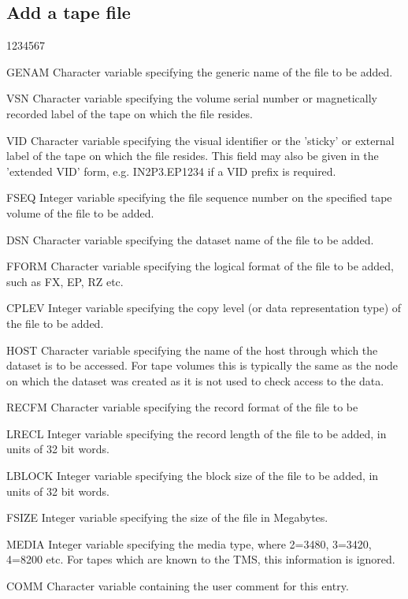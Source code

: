 \subsection{Add a tape file}
\begin{DLtt}{1234567}
\item [GENAM]Character variable specifying the generic name of the file
to be added.
\item[VSN]Character variable specifying the volume serial number or
magnetically recorded label of the tape on which the file resides.
\item[VID]Character variable specifying the visual identifier or the
'sticky' or external label of the tape on which the file resides.
This field may also be given in the 'extended VID' form,
e.g. IN2P3.EP1234 if a VID prefix is required.
\item[FSEQ]
Integer variable specifying the file sequence number on
the specified tape volume of the file to be added.
\item[DSN]Character variable specifying the dataset name of the file
to be added.
\item[FFORM]Character variable specifying the logical format of the file
to be added, such as FX, EP, RZ etc.
\item[CPLEV]
Integer variable specifying the copy level (or data representation
type) of the file to be added.
\item[HOST]
Character variable specifying the name of the host through which
the dataset is to be accessed. For tape volumes this is typically the
same as the node on which the dataset was created as it is not
used to check access to the data.
\item[RECFM]Character variable specifying the record format of the file to be
\item[LRECL]
Integer variable specifying the record length of the file to be
added, in units of 32 bit words.
\item[LBLOCK]Integer variable specifying the block size of the file to be
added, in units of 32 bit words.
\item[FSIZE]
Integer variable specifying the size of the file in Megabytes.
\item[MEDIA]
Integer variable specifying the media type, where 2=3480, 3=3420,
4=8200 etc. For tapes which are known to the TMS, this information
is ignored.
\item[COMM]
Character variable containing the user comment for this entry.

\end{DLtt}
